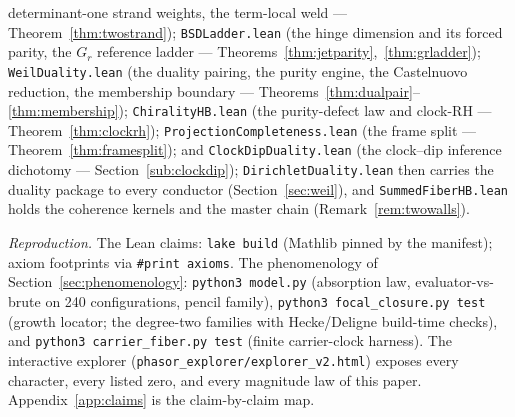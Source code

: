 \documentclass[11pt]{article}
\newcommand{\code}[1]{\texttt{#1}}
\begin{document}
determinant-one strand weights, the term-local weld --- Theorem~\ref{thm:twostrand});
\code{BSDLadder.lean} (the hinge dimension and its forced parity, the $G_r$ reference ladder ---
Theorems~\ref{thm:jetparity},~\ref{thm:grladder}); \code{WeilDuality.lean} (the duality pairing,
the purity engine, the Castelnuovo reduction, the membership boundary ---
Theorems~\ref{thm:dualpair}--\ref{thm:membership}); \code{ChiralityHB.lean} (the purity-defect law
and clock-RH --- Theorem~\ref{thm:clockrh}); \code{ProjectionCompleteness.lean} (the frame split
--- Theorem~\ref{thm:framesplit}); and \code{ClockDipDuality.lean} (the clock--dip inference
dichotomy --- Section~\ref{sub:clockdip}); \code{DirichletDuality.lean} then carries the duality
package to every conductor (Section~\ref{sec:weil}), and \code{SummedFiberHB.lean} holds the
coherence kernels and the master chain (Remark~\ref{rem:twowalls}).

\medskip
\noindent\emph{Reproduction.}  The Lean claims: \code{lake build} (Mathlib pinned by the manifest);
axiom footprints via \code{\#print axioms}.  The phenomenology of
Section~\ref{sec:phenomenology}: \code{python3 model.py} (absorption law, evaluator-vs-brute on 240
configurations, pencil family), \code{python3 focal\_closure.py test} (growth locator; the
degree-two families with Hecke/Deligne build-time checks), and \code{python3 carrier\_fiber.py test}
(finite carrier-clock harness).  The interactive explorer
(\code{phasor\_explorer/explorer\_v2.html}) exposes every character, every listed zero, and every
magnitude law of this paper.  Appendix~\ref{app:claims} is the claim-by-claim map.
\end{document}
